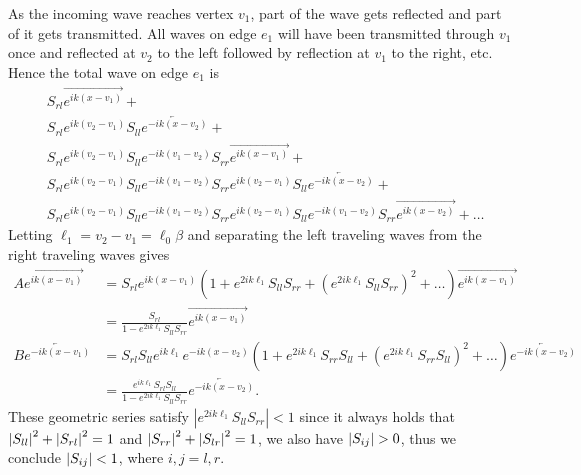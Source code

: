 As the incoming wave reaches vertex $v_1$, part of the wave gets reflected and part of it gets transmitted. All waves on edge $e_1$ will have been transmitted through $v_1$ once and reflected at $v_2$ to the left followed by reflection at $v_1$ to the right, etc. Hence the total wave on edge $e_1$ is
\begin{equation}\label{eq: bouncing waves}
  \begin{aligned}
    & S_{rl} \overrightarrow{e^{ik(x-v_1)}} + \\
    & S_{rl} e^{ik(v_2-v_1)} S_{ll} \overleftarrow{e^{-ik(x-v_2)}} + \\
    & S_{rl} e^{ik(v_2-v_1)} S_{ll} e^{-ik(v_1-v_2)} S_{rr} \overrightarrow{e^{ik(x-v_1)}} + \\
    & S_{rl} e^{ik(v_2-v_1)} S_{ll} e^{-ik(v_1-v_2)} S_{rr} e^{ik(v_2-v_1)} S_{ll} \overleftarrow{e^{-ik(x-v_2)}} + \\
    & S_{rl} e^{ik(v_2-v_1)} S_{ll} e^{-ik(v_1-v_2)} S_{rr} e^{ik(v_2-v_1)} S_{ll} e^{-ik(v_1-v_2)} S_{rr} \overrightarrow{e^{ik(x-v_2)}} + \ldots
  \end{aligned}
\end{equation}
Letting $\ell_1 = v_2-v_1 = \ell_0\beta$ and separating the left traveling waves from the right traveling waves gives
\begin{align*}
  A \overrightarrow{e^{ik(x-v_1)}} &= S_{rl} e^{ik(x-v_1)} \left(1 + e^{2ik\ell_1} S_{ll} S_{rr} + \left(e^{2ik\ell_1} S_{ll} S_{rr}\right)^2 + \ldots \right) \overrightarrow{e^{ik(x-v_1)}} \\
  &= \frac{S_{rl}}{1-e^{2ik\ell_1}S_{ll}S_{rr}} \overrightarrow{e^{ik(x-v_1)}} \\
  B \overleftarrow{e^{-ik(x-v_1)}} &= S_{rl} S_{ll} e^{ik\ell_1} e^{-ik(x-v_2)} \left(1 + e^{2ik\ell_1} S_{rr} S_{ll} +  \left(e^{2ik\ell_1} S_{rr} S_{ll}\right)^2 + \ldots \right) \overleftarrow{e^{-ik(x-v_2)}} \\
  &= \frac{e^{ik\ell_1} S_{rl} S_{ll}}{1 - e^{2ik\ell_1} S_{ll} S_{rr}} \overleftarrow{e^{-ik(x-v_2)}}.
\end{align*}
These geometric series satisfy $|e^{2ik\ell_1}S_{ll}S_{rr}| < 1$ since it always holds that $\left\lvert S_{ll}\right\rvert^2 + \left\lvert S_{rl}\right\rvert^2 = 1$ and $\left\lvert S_{rr}\right\rvert^2 + \left\lvert S_{lr}\right\rvert^2 = 1$, we also have $\left\lvert S_{ij}\right\rvert > 0$, thus we conclude $\left\lvert S_{ij}\right\rvert < 1$, where $i,j = l,r$.

